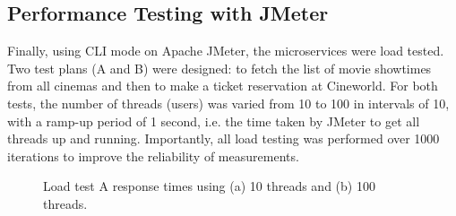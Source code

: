 \subsection{Performance Testing with JMeter}

Finally, using CLI mode on Apache JMeter, the microservices were load tested. Two test plans (A and B) were designed: to fetch the list of movie showtimes from all cinemas and then to make a ticket reservation at Cineworld. For both tests, the number of threads (users) was varied from 10 to 100 in intervals of 10, with a ramp-up period of 1 second, i.e. the time taken by JMeter to get all threads up and running. Importantly, all load testing was performed over 1000 iterations to improve the reliability of measurements.

\begin{figure}[H]
  \centering
  \caption{Load test A response times using (a) 10 threads and (b) 100 threads.}
  \label{fig:cs01-lta-12}
\end{figure}

